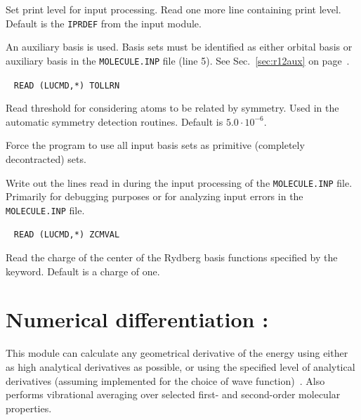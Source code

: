 \begin{description}
Set print level for input processing.  Read one more line containing
print level. Default is the \verb|IPRDEF| from the  input
module.

\item[\Key{R12AUX}] An auxiliary basis is used.
Basis sets must be identified as either orbital basis or
auxiliary basis in the \verb|MOLECULE.INP| file (line 5).
See Sec.~\ref{sec:r12aux} on page~\pageref{sec:r12aux}.

\item[\Key{SYMTHR}]\verb| |\newline
\verb|READ (LUCMD,*) TOLLRN|

Read threshold for considering atoms to be related by symmetry. Used
in the automatic symmetry detection routines. Default is $5.0\cdot
10^{-6}$.

\item[\Key{UNCONT}] Force the program to use all input basis sets as primitive (completely decontracted) sets.

\item[\Key{WRTLIN}] Write out the lines read in during the input
  processing of the \verb|MOLECULE.INP| file. Primarily for debugging
  purposes or for analyzing input errors in the \verb|MOLECULE.INP|
  file.

\item[\Key{ZCMVAL}]\verb| |\newline
\verb|READ (LUCMD,*) ZCMVAL|

Read the charge of the center of the Rydberg basis functions specified
by the  keyword. Default is a charge of one.

\end{description}

\section{Numerical differentiation : }\label{sec:nmddrv}

This module can calculate any geometrical derivative of the energy
using either as high analytical derivatives as possible, or using the
specified level of analytical derivatives (assuming implemented for
the choice of wave function)~\cite{numder}. Also performs vibrational averaging over
selected first- and second-order molecular properties.

